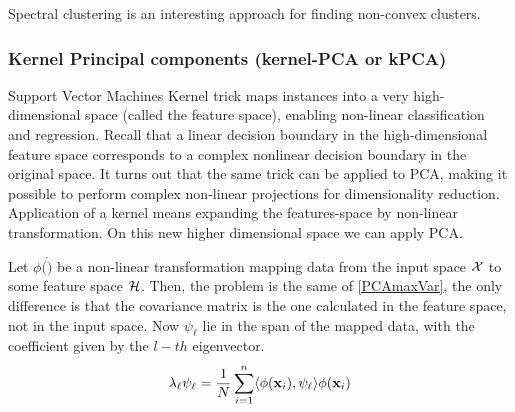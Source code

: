 Spectral clustering is an interesting approach for finding non-convex clusters. 
\subsubsection{Kernel Principal components  (kernel-PCA or kPCA)}
\label{KPCA}
Support Vector Machines Kernel trick maps instances into a very high-dimensional space (called the feature space), enabling non-linear classification and regression. Recall that a linear decision boundary in the high-dimensional feature space corresponds to a complex nonlinear decision boundary in the original space.
It turns out that the same trick can be applied to PCA, making it possible to perform complex non-linear projections for dimensionality reduction. Application of a kernel means expanding the features-space by non-linear transformation. On this new higher dimensional space we can apply PCA.

Let $\phi(\dot)$ be a non-linear transformation mapping data from the input space $\CMcal{X}$ to some feature space $\CMcal{H}$. Then, the problem is the same of \autoref{PCAmaxVar}, the only difference is that the covariance matrix is the one calculated in the feature space, not in the input space. Now $\psi_\ell$ lie in the span of the mapped data, with the coefficient given by the $l-th$ eigenvector.
\begin{equation}
\lambda_\ell\psi_\ell = \frac{1}{N}\sum_{i=1}^n \langle \phi(\mathbf{x}_i), \psi_\ell\rangle \phi(\mathbf{x}_i)
\end{equation}

